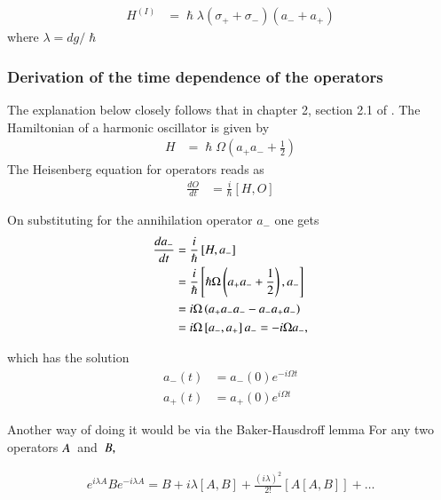 \begin{align}\label{eq:10}
H^{(I)}&= \hslash\lambda(\sigma_{+} + \sigma_{-})({a}_{-} + {a}_{+})
\end{align}
where $\lambda=dg/\hslash $%

\subsubsection{Derivation of the time dependence of the operators}
The explanation below closely follows that in chapter 2, section 2.1 of \citep{gerry2005introductory}.
The Hamiltonian of a harmonic oscillator is given by 
\begin{align}\label{eq:10.1}
H &=\hslash \Omega \left( { a}_{+  }a_{-} +\frac { 1 }{ 2 }  \right)
\end{align}
The Heisenberg equation for operators reads as
\begin{align}\label{eq:10.2}
\frac { d O  }{ dt } &=\frac { i }{ \hslash  } \left[ H ,O  \right] 
\end{align}

On substituting for the annihilation operator $a_{-}$ one gets
\begin{align}\label{eq:10.3} %
\frac { da_{-}  }{ dt } &=\frac { i }{ \hslash  } \left[ H ,a_{-}  \right]\notag\\
&=\frac { i }{ \hslash  }\left[\hslash \Omega \left( { a}_{+  }a_{-} +\frac { 1 }{ 2 }  \right),a_{-}\right]\\
&=i\Omega \left( { a}_{+  }a_{-}a_{-} -a_{-}{ a}_{+  }a_{-}  \right)\notag\\ 
&=i\Omega \left[{a}_{-},{{a}}_{+}\right]{a_{-}}=-i\Omega {a_{-}},\notag 
\end{align}

which has the solution
\begin{align}\label{eq:10.4}
{a}_{-}(t)&={a}_{-}(0){ e }^{ -i\Omega t }\\
{a}_{+}(t)&={a}_{+}(0){ e }^{  i\Omega t }
\end{align}


Another way of doing it would be via the Baker-Hausdroff lemma \citep{sakurai1995modern}
For any two operators ${A} \thinspace $ and $\thinspace B,$

\begin{align}\label{eq:10.5}
{e }^{ i\lambda A  }B { e }^{ -i\lambda A }=B+{i}\lambda\left[A,B\right]+\frac{{\left(i\lambda  \right)}^{2}}{2!}\left[A\left[A,B\right]\right]+\dots
\end{align}


